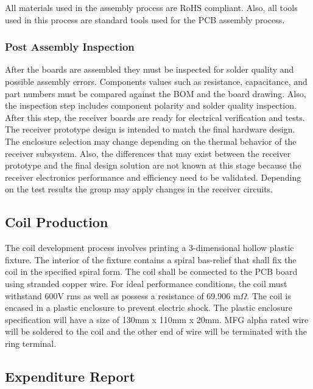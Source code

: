 \documentclass[12pt]{article}
\begin{document}
 \noindent
All materials used in the assembly process are  RoHS compliant. Also, all tools used in this process are standard tools used for the PCB assembly process.
 
 \subsubsection{Post Assembly Inspection}

\indent
After the boards are assembled they must be inspected for solder quality and possible assembly errors. Components values such as resistance, capacitance, and part numbers must be compared against the BOM and the board drawing. Also, the inspection step includes component polarity and solder quality inspection. After this step, the receiver boards are ready for electrical verification and tests.\\
 
 \indent
The receiver prototype design is intended to match the final hardware design. The enclosure selection may change depending on the thermal behavior of the receiver subsystem. Also, the differences that may exist between the receiver prototype and the final design solution are not known at this stage because the receiver electronics performance and efficiency need to be validated. Depending on the test results the group may apply changes in the receiver circuits.
\hfill
\pagebreak

\subsection{Coil Production}

\indent \indent
The coil development process involves printing a 3-dimensional hollow plastic fixture. The interior of the fixture contains a spiral bas-relief that shall fix the coil in the specified spiral form. The coil shall be connected to the PCB board using stranded copper wire. For ideal performance conditions, the coil must withstand 600V rms as well as possess a resistance of 69.906 m$\Omega$. The coil is encased in a plastic enclosure to prevent electric shock. The plastic enclosure specification will have a size of 130mm x 110mm x 20mm. MFG alpha rated wire will be soldered to the coil and the other end of wire will be terminated with the ring terminal.  

\subsection{Expenditure Report}
\end{document}
